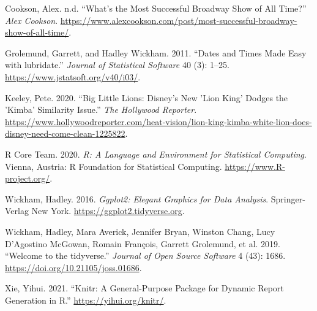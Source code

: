 \documentclass[
]{article}
\begin{document}
\hypertarget{refs}{}
\leavevmode\hypertarget{ref-alex}{}%
Cookson, Alex. n.d. ``What's the Most Successful Broadway Show of All Time?'' \emph{Alex Cookson}. \url{https://www.alexcookson.com/post/most-successful-broadway-show-of-all-time/}.

\leavevmode\hypertarget{ref-lubr}{}%
Grolemund, Garrett, and Hadley Wickham. 2011. ``Dates and Times Made Easy with lubridate.'' \emph{Journal of Statistical Software} 40 (3): 1--25. \url{https://www.jstatsoft.org/v40/i03/}.

\leavevmode\hypertarget{ref-keeley_2020}{}%
Keeley, Pete. 2020. ``Big Little Lions: Disney's New 'Lion King' Dodges the 'Kimba' Similarity Issue.'' \emph{The Hollywood Reporter}. \url{https://www.hollywoodreporter.com/heat-vision/lion-king-kimba-white-lion-does-disney-need-come-clean-1225822}.

\leavevmode\hypertarget{ref-citeR}{}%
R Core Team. 2020. \emph{R: A Language and Environment for Statistical Computing}. Vienna, Austria: R Foundation for Statistical Computing. \url{https://www.R-project.org/}.

\leavevmode\hypertarget{ref-gg}{}%
Wickham, Hadley. 2016. \emph{Ggplot2: Elegant Graphics for Data Analysis}. Springer-Verlag New York. \url{https://ggplot2.tidyverse.org}.

\leavevmode\hypertarget{ref-tidy}{}%
Wickham, Hadley, Mara Averick, Jennifer Bryan, Winston Chang, Lucy D'Agostino McGowan, Romain François, Garrett Grolemund, et al. 2019. ``Welcome to the tidyverse.'' \emph{Journal of Open Source Software} 4 (43): 1686. \url{https://doi.org/10.21105/joss.01686}.

\leavevmode\hypertarget{ref-knitr}{}%
Xie, Yihui. 2021. ``Knitr: A General-Purpose Package for Dynamic Report Generation in R.'' \url{https://yihui.org/knitr/}.
\end{document}
